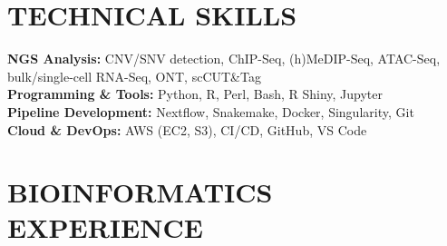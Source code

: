 \documentclass[11pt,letterpaper,sans]{moderncv}        %
\makeatletter
\newcommand*{\customcvproject}[4][.25em]{
  \begin{tabular}{@{}l} 
    {\bfseries #2}
  \end{tabular}
  \hfill%
  \begin{tabular}{l@{}}
     {\itshape #3}
  \end{tabular}
  \ifx&#4&%
  \else{\\%
    \begin{minipage}{\maincolumnwidth}%
      \small#4%
    \end{minipage}}\fi%
  \par\addvspace{#1}}
\makeatother
\begin{document}

\section{TECHNICAL SKILLS}
\begin{minipage}{\maincolumnwidth}%
	\small{
	
	\textbf{NGS Analysis:} CNV/SNV detection, ChIP-Seq, (h)MeDIP-Seq, ATAC-Seq, bulk/single-cell RNA-Seq, ONT, scCUT\&Tag\\
	\textbf{Programming \& Tools:} Python, R, Perl, Bash, R Shiny, Jupyter\\
	\textbf{Pipeline Development:} Nextflow, Snakemake, Docker, Singularity, Git\\
	\textbf{Cloud \& DevOps:} AWS (EC2, S3), CI/CD, GitHub, VS Code}%
\end{minipage}%

\section{BIOINFORMATICS EXPERIENCE}
\end{document}
